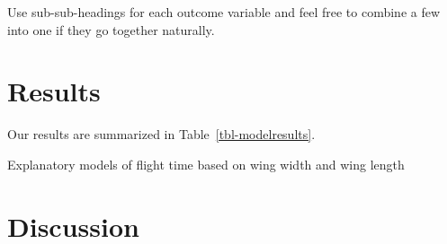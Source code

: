 \documentclass[
  letterpaper,
  DIV=11,
  numbers=noendperiod]{scrartcl}
\begin{document}
Use sub-sub-headings for each outcome variable and feel free to combine
a few into one if they go together naturally.

\section{Results}\label{results}

Our results are summarized in Table~\ref{tbl-modelresults}.

\begin{table}

\caption{\label{tbl-modelresults}Explanatory models of flight time based
on wing width and wing length}


\end{table}%

\section{Discussion}\label{discussion}
\end{document}
